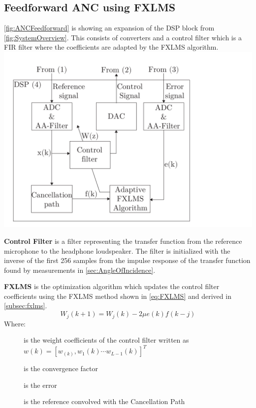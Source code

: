 \subsection*{Feedforward ANC using FXLMS}
\autoref{fig:ANCFeedforward} is showing an expansion of the DSP block from \autoref{fig:SystemOverview}. This consists of converters and a control filter which is a FIR filter where the coefficients are adapted by the FXLMS algorithm. 
{
	\includegraphics[width=1\columnwidth]{figures/ArticleIllustrations/ANCFeedForward}
	\label{fig:ANCFeedforward}
}



\textbf{Control Filter} is a filter representing the transfer function from the reference microphone to the headphone loudspeaker. The filter is initialized with the inverse of the first 256 samples from the impulse response of the transfer function found by measurements in \autoref{sec:AngleOfIncidence}.  

\textbf{FXLMS} is the optimization algorithm which updates the control filter coefficients using the FXLMS method shown in \autoref{eq:FXLMS} and derived in \autoref{subsec:fxlms}. 
\begin{equation}\label{eq:FXLMS}
W_j(k+1) = W_j(k) - 2\mu e(k)f(k-j) 
\end{equation}
Where:
\vspace{-8mm} %
\begin{description}
	\item[] is the weight coefficients of the control filter written as  $w(k)=[w_(k),w_1(k) \cdots w_{L-1}(k)]^T$
	\item[\text{$\mu$}] is the convergence factor
	\item[] is the error 
	\item[] is the reference convolved with the Cancellation Path
\end{description}


